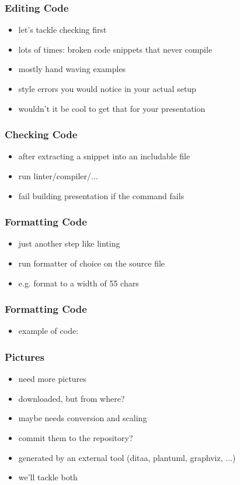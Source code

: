 \documentclass{beamer}
\begin{document}
\begin{frame}
  \frametitle{Editing Code}
  \begin{itemize}
  \item let's tackle checking first
  \item lots of times: broken code snippets that never compile
  \item mostly hand waving examples
  \item style errors you would notice in your actual setup
  \item wouldn't it be cool to get that for your presentation
  \end{itemize}
\end{frame}

\begin{frame}
  \frametitle{Checking Code}
  \begin{itemize}
  \item after extracting a snippet into an includable file
  \item run linter/compiler/...
  \item fail building presentation if the command fails
  \end{itemize}
\end{frame}

\begin{frame}
  \frametitle{Formatting Code}
  \begin{itemize}
  \item just another step like linting
  \item run formatter of choice on the source file
  \item e.g. format to a width of 55 chars
  \end{itemize}
\end{frame}

\begin{frame}
  \frametitle{Formatting Code}
  \begin{itemize}
  \item example of code:
  \end{itemize}
\end{frame}

\begin{frame}
  \frametitle{Pictures}
  \begin{itemize}
  \item need more pictures
  \item downloaded, but from where?
  \item maybe needs conversion and scaling
  \item commit them to the repository?
  \item generated by an external tool (ditaa, plantuml, graphviz, ...)
  \item we'll tackle both
  \end{itemize}
\end{frame}
\end{document}
